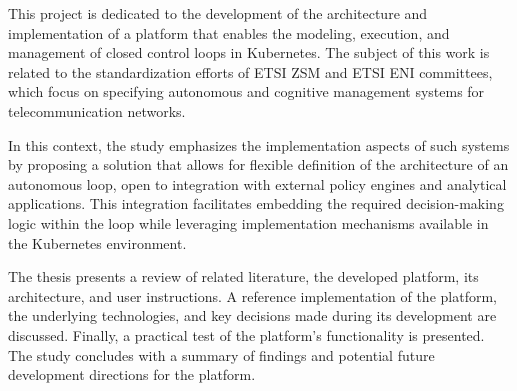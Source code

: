 This project is dedicated to the development of the architecture and implementation of a platform that enables the modeling, execution, and management of closed control loops in Kubernetes. The subject of this work is related to the standardization efforts of ETSI ZSM and ETSI ENI committees, which focus on specifying autonomous and cognitive management systems for telecommunication networks.

In this context, the study emphasizes the implementation aspects of such systems by proposing a solution that allows for flexible definition of the architecture of an autonomous loop, open to integration with external policy engines and analytical applications. This integration facilitates embedding the required decision-making logic within the loop while leveraging implementation mechanisms available in the Kubernetes environment.

The thesis presents a review of related literature, the developed platform, its architecture, and user instructions. A reference implementation of the platform, the underlying technologies, and key decisions made during its development are discussed. Finally, a practical test of the platform's functionality is presented. The study concludes with a summary of findings and potential future development directions for the platform.